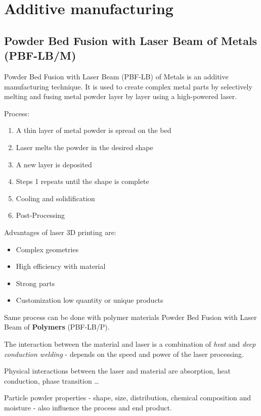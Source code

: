\chapter{Additive manufacturing}


\section{Powder Bed Fusion with Laser Beam of Metals (PBF-LB/M)}

Powder Bed Fusion with Laser Beam (PBF-LB) of Metals is an additive manufacturing  technique.
It is used to create complex metal parts by selectively melting and fusing metal powder layer by layer 
using a high-powered laser.

Process:
\begin{enumerate}
    \item A thin layer of metal powder is spread on the bed 
    \item Laser melts the powder in the desired shape
    \item A new layer is deposited
    \item Steps 1  repeats until the shape is complete
    \item Cooling and solidification
    \item Post-Processing
\end{enumerate}

Advantages of laser 3D printing are:
\begin{itemize}
    \item Complex geometries
    \item High efficiency with material
    \item Strong parts
    \item Customization \pd low quantity or unique products
\end{itemize}

Same process can be done with polymer materials \pd Powder Bed Fusion with Laser Beam of \textbf{Polymers} (PBF-LB/P).

The interaction between the material and laser is a combination of \textit{heat } and \textit{deep conduction welding} - depends on the speed and 
power of the laser processing. 

Physical interactions between the laser and material are absorption, heat conduction, phase transition \dots

Particle powder properties - shape, size, distribution, chemical composition and moisture - also influence the process and 
end product. 

